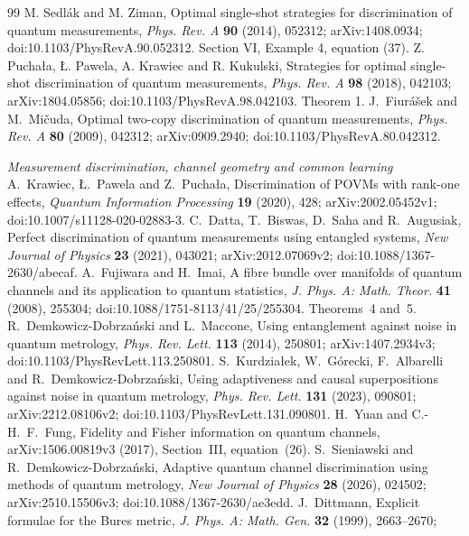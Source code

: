 \begin{thebibliography}{99}
 M. Sedl\'ak and M. Ziman,
Optimal single-shot strategies for discrimination of quantum measurements,
\emph{Phys. Rev. A} \textbf{90} (2014), 052312;
arXiv:1408.0934; doi:10.1103/PhysRevA.90.052312.
Section VI, Example 4, equation (37).
 Z. Pucha\l a, \L. Pawela, A. Krawiec and R. Kukulski,
Strategies for optimal single-shot discrimination of quantum measurements,
\emph{Phys. Rev. A} \textbf{98} (2018), 042103;
arXiv:1804.05856; doi:10.1103/PhysRevA.98.042103. Theorem 1.
 J.~Fiur\'a\v sek and M.~Mi\v cuda,
Optimal two-copy discrimination of quantum measurements,
\emph{Phys. Rev. A} \textbf{80} (2009), 042312;
arXiv:0909.2940; doi:10.1103/PhysRevA.80.042312.


\item[]\textit{Measurement discrimination, channel geometry and common learning}
 A.~Krawiec, \L.~Pawela and Z.~Pucha\l a,
Discrimination of POVMs with rank-one effects,
\emph{Quantum Information Processing} \textbf{19} (2020), 428;
arXiv:2002.05452v1; doi:10.1007/s11128-020-02883-3.
 C.~Datta, T.~Biswas, D.~Saha and R.~Augusiak,
Perfect discrimination of quantum measurements using entangled systems,
\emph{New Journal of Physics} \textbf{23} (2021), 043021;
arXiv:2012.07069v2; doi:10.1088/1367-2630/abecaf.
 A.~Fujiwara and H.~Imai,
A fibre bundle over manifolds of quantum channels and its application
to quantum statistics,
\emph{J. Phys. A: Math. Theor.} \textbf{41} (2008), 255304;
doi:10.1088/1751-8113/41/25/255304. Theorems~4 and~5.
 R.~Demkowicz-Dobrza\'nski and L.~Maccone,
Using entanglement against noise in quantum metrology,
\emph{Phys. Rev. Lett.} \textbf{113} (2014), 250801;
arXiv:1407.2934v3; doi:10.1103/PhysRevLett.113.250801.
 S.~Kurdzia\l ek, W.~G\'orecki, F.~Albarelli
and R.~Demkowicz-Dobrza\'nski,
Using adaptiveness and causal superpositions against noise in quantum metrology,
\emph{Phys. Rev. Lett.} \textbf{131} (2023), 090801;
arXiv:2212.08106v2; doi:10.1103/PhysRevLett.131.090801.
 H.~Yuan and C.-H.~F.~Fung,
Fidelity and Fisher information on quantum channels,
arXiv:1506.00819v3 (2017), Section~III, equation~(26).
 S.~Sieniawski and R.~Demkowicz-Dobrza\'nski,
Adaptive quantum channel discrimination using methods of quantum metrology,
\emph{New Journal of Physics} \textbf{28} (2026), 024502;
arXiv:2510.15506v3; doi:10.1088/1367-2630/ae3edd.
 J.~Dittmann,
Explicit formulae for the Bures metric,
\emph{J. Phys. A: Math. Gen.} \textbf{32} (1999), 2663--2670;

\end{thebibliography}
